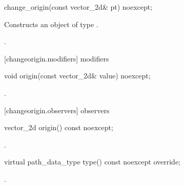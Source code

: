 \begin{itemdecl}
    change_origin(const vector_2d& pt) noexcept;
\end{itemdecl}
\begin{itemdescr}
	\pnum
	\effects
	Constructs an object of type .
	
	\pnum
	\postconditions
	.
\end{itemdescr}

 [changeorigin.modifiers]{ modifiers}

\begin{itemdecl}
    void origin(const vector_2d& value) noexcept;
\end{itemdecl}
\begin{itemdescr}
	\pnum
	\postconditions
	.
	
\end{itemdescr}

 [changeorigin.observers]{ observers}

\begin{itemdecl}
    vector_2d origin() const noexcept;
\end{itemdecl}
\begin{itemdescr}
	\pnum
	\returns
	.

\end{itemdescr}

\begin{itemdecl}
    virtual path_data_type type() const noexcept override;
\end{itemdecl}
\begin{itemdescr}
	\pnum
	\returns
	.

\end{itemdescr}
